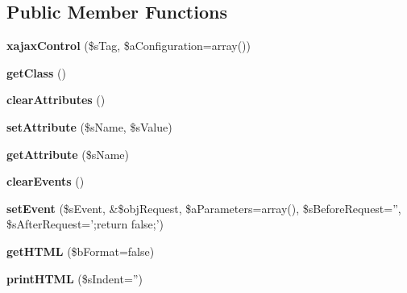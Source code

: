 \subsection*{Public Member Functions}
\begin{DoxyCompactItemize}
\item 
\hypertarget{classxajaxControl_ac9dc2f8d585da7c7ac6f6e133a411850}{
{\bfseries xajaxControl} (\$sTag, \$aConfiguration=array())}
\label{classxajaxControl_ac9dc2f8d585da7c7ac6f6e133a411850}

\item 
\hypertarget{classxajaxControl_ae83235eebab4235cc1a4d5e3f6262e8b}{
{\bfseries getClass} ()}
\label{classxajaxControl_ae83235eebab4235cc1a4d5e3f6262e8b}

\item 
\hypertarget{classxajaxControl_a36de5ec14887724c65014f3f4eef3526}{
{\bfseries clearAttributes} ()}
\label{classxajaxControl_a36de5ec14887724c65014f3f4eef3526}

\item 
\hypertarget{classxajaxControl_adc5e104b3f40980ba81cf60a0485aca9}{
{\bfseries setAttribute} (\$sName, \$sValue)}
\label{classxajaxControl_adc5e104b3f40980ba81cf60a0485aca9}

\item 
\hypertarget{classxajaxControl_aaa477bfd070cd09c90819b3df4f25ca4}{
{\bfseries getAttribute} (\$sName)}
\label{classxajaxControl_aaa477bfd070cd09c90819b3df4f25ca4}

\item 
\hypertarget{classxajaxControl_a8097ed52504172624394a3444964424c}{
{\bfseries clearEvents} ()}
\label{classxajaxControl_a8097ed52504172624394a3444964424c}

\item 
\hypertarget{classxajaxControl_ae78110c34ccaadfc0366307a4fa44f7b}{
{\bfseries setEvent} (\$sEvent, \&\$objRequest, \$aParameters=array(), \$sBeforeRequest='', \$sAfterRequest=';return false;')}
\label{classxajaxControl_ae78110c34ccaadfc0366307a4fa44f7b}

\item 
\hypertarget{classxajaxControl_a867a6afde7d163108090563a49de6792}{
{\bfseries getHTML} (\$bFormat=false)}
\label{classxajaxControl_a867a6afde7d163108090563a49de6792}

\item 
\hypertarget{classxajaxControl_a58b8a3f662ce1b068d7358c994ba0e8f}{
{\bfseries printHTML} (\$sIndent='')}
\label{classxajaxControl_a58b8a3f662ce1b068d7358c994ba0e8f}


\end{DoxyCompactItemize}
